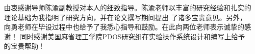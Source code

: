 
\begin{ack}
  由衷感谢导师陈渝副教授对本人的细致指导。陈渝老师以丰富的研究经验和扎实的理论基础为我指明了研究方向，并在论文撰写期间提出
了诸多宝贵意见。另外，向勇老师在毕设过程中也给予了我悉心指导和鼓励。在此向两位老师表示诚挚的感谢！
同时感谢美国麻省理工学院PDOS研究组在实验操作系统设计和编写上给予的宝贵帮助！
\end{ack}
